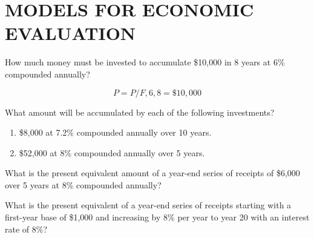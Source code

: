 
\chapter{MODELS FOR ECONOMIC EVALUATION}

\begin{exercises}
    \begin{exercise}
    \label{sea-8-1}
        How much money must be invested to accumulate \$10,000 in 8 years at 6\% compounded annually?
    \end{exercise}
    \begin{solution}
    \begin{equation}
        P=P/F,6,8=\$10,000
    \end{equation}
    \end{solution}
    
    \begin{exercise}
    \label{sea-8-2}
        What amount will be accumulated by each of the following investments?
        \begin{enumerate}[label=\alph*)]
            \item \$8,000 at 7.2\% compounded annually over 10 years.
            \item \$52,000 at 8\% compounded annually over 5 years.
        \end{enumerate}
    \end{exercise}
    \begin{solution}
    \end{solution}
    
    \begin{exercise}
    \label{sea-8-3}
        What is the present equivalent amount of a year-end series of receipts of \$6,000 over 5 years at 8\% compounded annually?
    \end{exercise}
    \begin{solution}
    \end{solution}
    
    \begin{exercise}
    \label{sea-8-4}
        What is the present equivalent of a year-end series of receipts starting with a first-year base of \$1,000 and increasing by 8\% per year to year 20 with an interest rate of 8\%?
    \end{exercise}
    \begin{solution}
    \end{solution}
    

\end{exercises}
